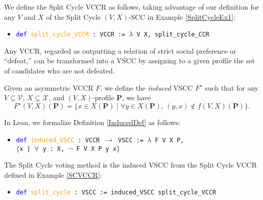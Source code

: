 \documentclass[runningheads]{llncs}
\begin{document}
\begin{example}\label{SCVCCR} We define the Split Cycle VCCR as follows, taking advantage of our definition for any $V$ and $X$ of the Split Cycle $(V,X)$-SCC in Example \ref{SplitCycleEx1}:
\begin{itemize}
\item[] \texttt{\textcolor{blue}{def} \textcolor{orange}{split\_cycle\_VCCR} : VCCR := \textcolor{blue}{$\lambda$} V X, split\_cycle\_CCR}
\end{itemize}
\end{example}

Any VCCR, regarded as outputting a relation of strict social preference or ``defeat,'' can be transformed into a VSCC by assigning to a given profile the set of candidates who are not defeated. 

\begin{definition}\label{InducedDef} \textnormal{Given an asymmetric VCCR $F$, we define the \textit{induced} VSCC $F^\star$ such that for any $V\subseteq\mathcal{V}$, $X\subseteq\mathcal{X}$, and $(V,X)$-profile $\mathbf{P}$, we have \[F^\star(V,X)(\mathbf{P})=\{x\in X(\mathbf{P})\mid \forall y\in X(\mathbf{P}),\, (y,x)\not\in f(V,X)(\mathbf{P})\}.\]}
\end{definition}
In Lean, we formalize Definition \ref{InducedDef} as follows:
\begin{itemize}
\item[] \texttt{\textcolor{blue}{def} \textcolor{orange}{induced\_VSCC} : VCCR $\to$ VSCC := $\lambda$ F V X P,} \\
\texttt{$\{$x | $\forall$ y : X, $\neg$ F V X P y x$\}$}
\end{itemize}

\begin{example} The Split Cycle voting method \cite{HP2020b} is the induced VSCC from the Split Cycle VCCR defined in Example \ref{SCVCCR}: 
\begin{itemize}
\item[] \texttt{\textcolor{blue}{def} \textcolor{orange}{split\_cycle} : VSCC := induced\_VSCC split\_cycle\_VCCR}
\end{itemize}
\end{example}
\end{document}
